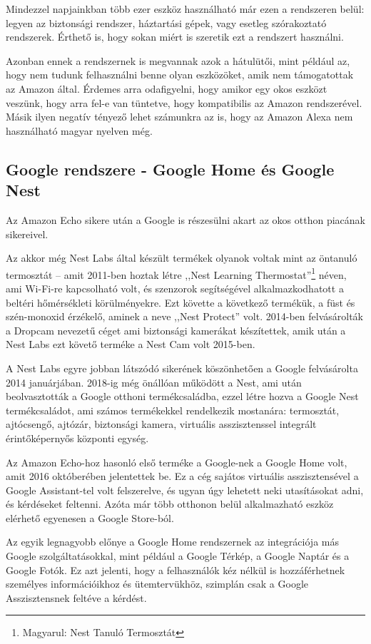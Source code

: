 \documentclass[
]{thesis-ekf}
\theoremstyle{definition}
\theoremstyle{remark}
\begin{document}
	Mindezzel napjainkban több ezer eszköz használható már ezen a rendszeren belül: legyen az biztonsági rendszer, háztartási gépek, vagy esetleg szórakoztató rendszerek. Érthető is, hogy sokan miért is szeretik ezt a rendszert használni.
	
	Azonban ennek a rendszernek is megvannak azok a hátulütői, mint például az, hogy nem tudunk felhasználni benne olyan eszközöket, amik nem támogatottak az Amazon által. Érdemes arra odafigyelni, hogy amikor egy okos eszközt veszünk, hogy arra fel-e van tüntetve, hogy kompatibilis az Amazon rendszerével. Másik ilyen negatív tényező lehet számunkra az is, hogy az Amazon Alexa nem használható magyar nyelven még.
	
	\subsection{Google rendszere - Google Home és Google Nest}
	Az Amazon Echo sikere után a Google is részesülni akart az okos otthon piacának sikereivel. 
	
	Az akkor még Nest Labs által készült termékek olyanok voltak mint az öntanuló termosztát -- amit 2011-ben hoztak létre ,,Nest Learning Thermostat''\footnote{Magyarul: Nest Tanuló Termosztát} néven, ami Wi-Fi-re kapcsolható volt, és szenzorok segítségével alkalmazkodhatott a beltéri hőmérsékleti körülményekre. Ezt követte a következő termékük, a füst és szén-monoxid érzékelő, aminek a neve ,,Nest Protect'' volt. 2014-ben felvásárolták a Dropcam nevezetű céget ami biztonsági kamerákat készítettek, amik után a Nest Labs ezt követő terméke a Nest Cam volt 2015-ben.
	
	A Nest Labs egyre jobban látszódó sikerének köszönhetően a Google felvásárolta 2014 januárjában. 2018-ig még önállóan működött a Nest, ami után beolvasztották a Google otthoni termékcsaládba, ezzel létre hozva a Google Nest termékcsaládot, ami számos termékekkel rendelkezik mostanára: termosztát, ajtócsengő, ajtózár, biztonsági kamera, virtuális asszisztenssel integrált érintőképernyős központi egység.\cite{google-home-nest}
	
	Az Amazon Echo-hoz hasonló első terméke a Google-nek a Google Home volt, amit 2016 októberében jelentettek be. Ez a cég sajátos virtuális asszisztensével a Google Assistant-tel volt felszerelve, és ugyan úgy lehetett neki utasításokat adni, és kérdéseket feltenni. Azóta már több otthonon belül alkalmazható eszköz elérhető egyenesen a Google Store-ból.\cite{google-home-nest}
	
	Az egyik legnagyobb előnye a Google Home rendszernek az integrációja más Google szolgáltatásokkal, mint például a Google Térkép, a Google Naptár és a Google Fotók. Ez azt jelenti, hogy a felhasználók kéz nélkül is hozzáférhetnek személyes információikhoz és ütemtervükhöz, szimplán csak a Google Asszisztensnek feltéve a kérdést.
	
\end{document}
